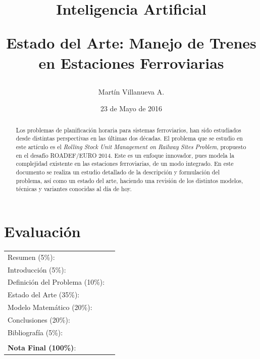 \documentclass[letter, 10pt]{article}
\begin{document}
\title{Inteligencia Artificial \\ \begin{Large}Estado del Arte: Manejo de Trenes en Estaciones Ferroviarias\end{Large}}
\author{Martín Villanueva A.}
\date{23 de Mayo de 2016}
\maketitle


\section*{Evaluación}

\begin{tabular}{ll}
Resumen (5\%): & \underline{\hspace{2cm}} \\
Introducción (5\%):  & \underline{\hspace{2cm}} \\
Definición del Problema (10\%):  & \underline{\hspace{2cm}} \\
Estado del Arte (35\%):  & \underline{\hspace{2cm}} \\
Modelo Matemático (20\%): &  \underline{\hspace{2cm}}\\
Conclusiones (20\%): &  \underline{\hspace{2cm}}\\
Bibliografía (5\%): & \underline{\hspace{2cm}}\\
 &  \\
\textbf{Nota Final (100\%)}:   & \underline{\hspace{2cm}}
\end{tabular}
\vspace{2cm}


\begin{abstract}
Los problemas de planificación horaria para sistemas ferroviarios, han sido estudiados desde distintas perspectivas en las últimas dos décadas. El problema que se estudio en este artículo es el \textit{Rolling Stock Unit Management on Railway Sites Problem}, propuesto en el desafío ROADEF/EURO 2014. Este es un enfoque innovador, pues modela la complejidad existente en las estaciones ferroviarias, de un modo integrado. En este documento se realiza un estudio detallado de la descripción y formulación del problema, así como un estado del arte, haciendo una revisión de los distintos modelos, técnicas y variantes conocidas al día de hoy.

\end{abstract}
\end{document}
